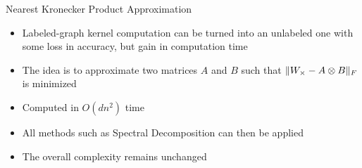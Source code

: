 \documentclass[compress]{beamer}
\DeclarePairedDelimiter{\norm}{\lVert}{\rVert}
\begin{document}
\begin{frame}{Nearest Kronecker Product Approximation}
\begin{itemize}
	\item Labeled-graph kernel computation can be turned into an unlabeled one with some loss in accuracy, but gain in computation time
	\item The idea is to approximate two matrices $A$ and $B$ such that $\norm{W_\times - A\otimes B}_F$ is minimized
	\item Computed in $O(dn^2)$ time \citep{van1993approximation}
	\item All methods such as Spectral Decomposition can then be applied
	\item The overall complexity remains unchanged
\end{itemize}
\end{frame}
\end{document}
